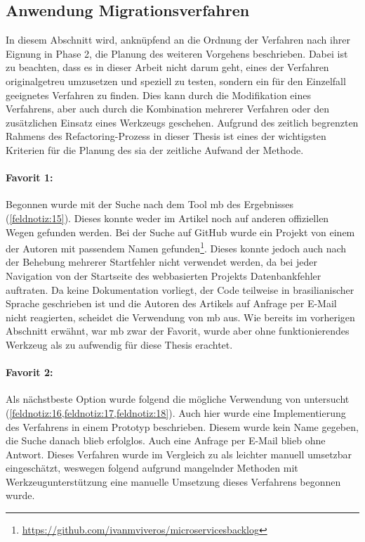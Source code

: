 \subsection{Anwendung Migrationsverfahren}
\label{sec:anwendung-verfahren}
In diesem Abschnitt wird, anknüpfend an die Ordnung der Verfahren nach ihrer Eignung in Phase 2, die Planung des weiteren Vorgehens beschrieben.
Dabei ist zu beachten, dass es in dieser Arbeit nicht darum geht, eines der Verfahren originalgetreu umzusetzen und speziell zu testen, sondern ein für den Einzelfall geeignetes Verfahren zu finden.
Dies kann durch die Modifikation eines Verfahrens, aber auch durch die Kombination mehrerer Verfahren oder den zusätzlichen Einsatz eines Werkzeugs geschehen.
Aufgrund des zeitlich begrenzten Rahmens des Refactoring-Prozess in dieser Thesis ist eines der wichtigsten Kriterien für die Planung des \gls{sia} der zeitliche Aufwand der Methode.

\paragraph{Favorit 1:} Begonnen wurde mit der Suche nach dem Tool \gls{mb} des Ergebnisses  (\cref{feldnotiz:15}).
Dieses konnte weder im Artikel noch auf anderen offiziellen Wegen gefunden werden.
Bei der Suche auf GitHub wurde ein Projekt von einem der Autoren mit passendem Namen gefunden\footnote{\url{https://github.com/ivanmviveros/microservicesbacklog}}.
Dieses konnte jedoch auch nach der Behebung mehrerer Startfehler nicht verwendet werden, da bei jeder Navigation von der Startseite des webbasierten Projekts Datenbankfehler auftraten.
Da keine Dokumentation vorliegt, der Code teilweise in brasilianischer Sprache geschrieben ist und die Autoren des Artikels auf Anfrage per E-Mail nicht reagierten, scheidet die Verwendung von \gls{mb} aus.
Wie bereits im vorherigen Abschnitt erwähnt, war \gls{mb} zwar der Favorit, wurde aber ohne funktionierendes Werkzeug als zu aufwendig für diese Thesis erachtet.

\paragraph{Favorit 2:} Als nächstbeste Option wurde folgend die mögliche Verwendung von  untersucht (\cref{feldnotiz:16,feldnotiz:17,feldnotiz:18}).
Auch hier wurde eine Implementierung des Verfahrens in einem Prototyp beschrieben.
Diesem wurde kein Name gegeben, die Suche danach blieb erfolglos.
Auch eine Anfrage per E-Mail blieb ohne Antwort.
Dieses Verfahren wurde im Vergleich zu   als leichter manuell umsetzbar eingeschätzt, weswegen folgend aufgrund mangelnder Methoden mit Werkzeugunterstützung eine manuelle Umsetzung dieses Verfahrens begonnen wurde.

